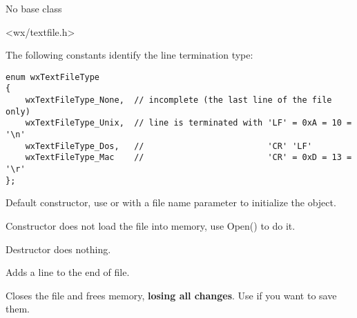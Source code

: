 
No base class


<wx/textfile.h>


The following constants identify the line termination type:

\begin{verbatim}
enum wxTextFileType
{
    wxTextFileType_None,  // incomplete (the last line of the file only)
    wxTextFileType_Unix,  // line is terminated with 'LF' = 0xA = 10 = '\n'
    wxTextFileType_Dos,   //                         'CR' 'LF'
    wxTextFileType_Mac    //                         'CR' = 0xD = 13 = '\r'
};
\end{verbatim}




\label{wxtextfilectordef}


Default constructor, use  or 
 with a file name parameter to initialize the object.

\label{wxtextfilector}


Constructor does not load the file into memory, use Open() to do it. 

\label{wxtextfiledtor}


Destructor does nothing.

\label{wxtextfileaddline}


Adds a line to the end of file.

\label{wxtextfileclose}


Closes the file and frees memory, {\bf losing all changes}. Use  
if you want to save them.

